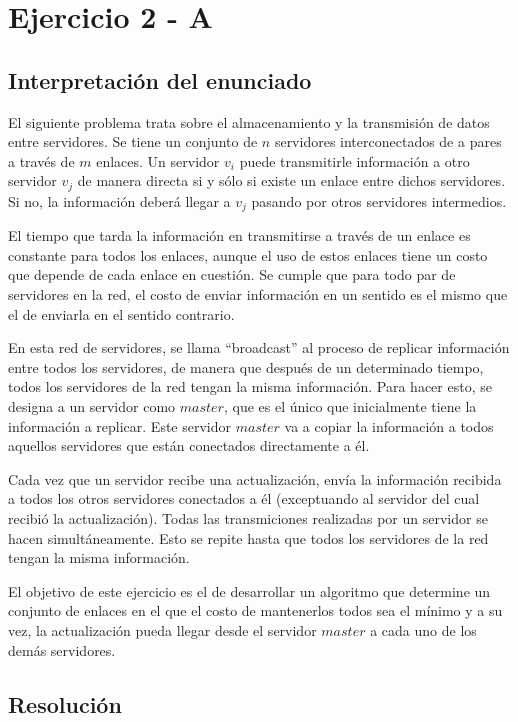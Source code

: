 \section{Ejercicio 2 - A}

\subsection{Interpretación del enunciado}

El siguiente problema trata sobre el almacenamiento y la transmisión de datos entre servidores. Se tiene un conjunto de $n$ servidores interconectados de a pares a través de $m$ enlaces. Un servidor $v_i$ puede transmitirle información a otro servidor $v_j$ de manera directa si y sólo si existe un enlace entre dichos servidores. Si no, la información deberá llegar a $v_j$ pasando por otros servidores intermedios.

El tiempo que tarda la información en transmitirse a través de un enlace es constante para todos los enlaces, aunque el uso de estos enlaces tiene un costo que depende de cada enlace en cuestión. Se cumple que para todo par de servidores en la red, el costo de enviar información en un sentido es el mismo que el de enviarla en el sentido contrario.

En esta red de servidores, se llama ``broadcast'' al proceso de replicar información entre todos los servidores, de manera que después de un determinado tiempo, todos los servidores de la red tengan la misma información. Para hacer esto, se designa a un servidor como $master$, que es el único que inicialmente tiene la información a replicar. Este servidor $master$ va a copiar la información a todos aquellos servidores que están conectados directamente a él.

Cada vez que un servidor recibe una actualización, envía la información recibida a todos los otros servidores conectados a él (exceptuando al servidor del cual recibió la actualización). Todas las transmiciones realizadas por un servidor se hacen simultáneamente. Esto se repite hasta que todos los servidores de la red tengan la misma información.

El objetivo de este ejercicio es el de desarrollar un algoritmo que determine un conjunto de enlaces en el que el costo de mantenerlos todos sea el mínimo y a su vez, la actualización pueda llegar desde el servidor $master$ a cada uno de los demás servidores.

\subsection{Resolución}

